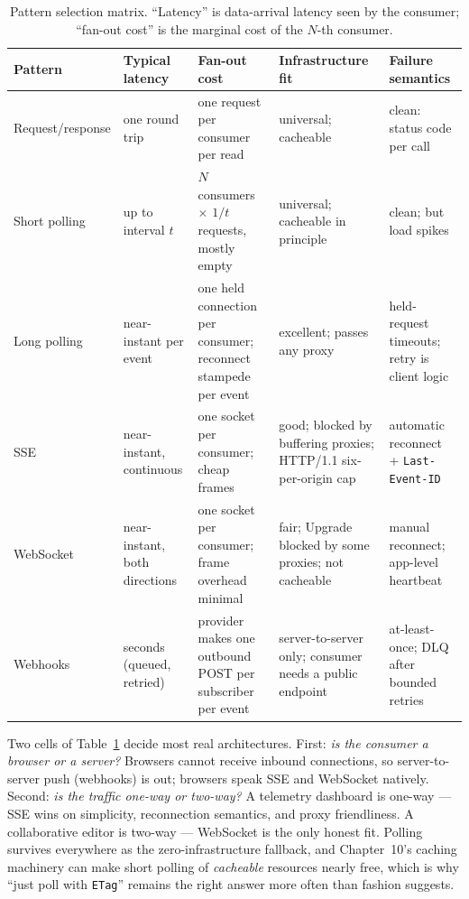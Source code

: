 \begin{table}[htbp]
  \centering
  \small
  \begin{tabularx}{\textwidth}{l X X X X}
    \toprule
    \textbf{Pattern} & \textbf{Typical latency} & \textbf{Fan-out cost} & \textbf{Infrastructure fit} & \textbf{Failure semantics} \\
    \midrule
    Request/response & one round trip & one request per consumer per read & universal; cacheable & clean: status code per call \\
    Short polling & up to interval $t$ & $N$ consumers $\times$ $1/t$ requests, mostly empty & universal; cacheable in principle & clean; but load spikes \\
    Long polling & near-instant per event & one held connection per consumer; reconnect stampede per event & excellent; passes any proxy & held-request timeouts; retry is client logic \\
    SSE & near-instant, continuous & one socket per consumer; cheap frames & good; blocked by buffering proxies; HTTP/1.1 six-per-origin cap & automatic reconnect + \texttt{Last-Event-ID} \\
    WebSocket & near-instant, both directions & one socket per consumer; frame overhead minimal & fair; Upgrade blocked by some proxies; not cacheable & manual reconnect; app-level heartbeat \\
    Webhooks & seconds (queued, retried) & provider makes one outbound POST per subscriber per event & server-to-server only; consumer needs a public endpoint & at-least-once; DLQ after bounded retries \\
    \bottomrule
  \end{tabularx}
  \caption{Pattern selection matrix. ``Latency'' is data-arrival latency seen
  by the consumer; ``fan-out cost'' is the marginal cost of the $N$-th
  consumer.}
  \label{tab:ch11-pattern-matrix}
\end{table}

Two cells of Table~\ref{tab:ch11-pattern-matrix} decide most real
architectures. First: \emph{is the consumer a browser or a server?} Browsers
cannot receive inbound connections, so server-to-server push (webhooks) is
out; browsers speak SSE and WebSocket natively. Second: \emph{is the traffic
one-way or two-way?} A telemetry dashboard is one-way --- SSE wins on
simplicity, reconnection semantics, and proxy friendliness. A collaborative
editor is two-way --- WebSocket is the only honest fit. Polling survives
everywhere as the zero-infrastructure fallback, and Chapter~10's caching
machinery can make short polling of \emph{cacheable} resources nearly free,
which is why ``just poll with \texttt{ETag}'' remains the right answer more
often than fashion suggests.

